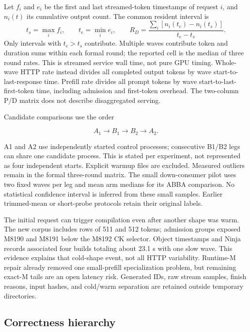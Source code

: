 \documentclass[sigplan,10pt]{acmart}
\begin{document}
Let $f_i$ and $e_i$ be the first and last streamed-token timestamps of request $i$, and $n_i(t)$ its cumulative output count. The common resident interval is
\begin{equation}
  t_s=\max_i f_i,\qquad t_e=\min_i e_i,\qquad
  R_D=\frac{\sum_i[n_i(t_e)-n_i(t_s)]}{t_e-t_s}.
\end{equation}
Only intervals with $t_e>t_s$ contribute. Multiple waves contribute token and duration sums within each formal round; the reported cell is the median of three round rates. This is streamed service wall time, not pure GPU timing. Whole-wave HTTP rate instead divides all completed output tokens by wave start-to-last-response time. Prefill rate divides all prompt tokens by wave start-to-last-first-token time, including admission and first-token overhead. The two-column P/D matrix does not describe disaggregated serving.

Candidate comparisons use the order

\begin{equation}
  A_1 \rightarrow B_1 \rightarrow B_2 \rightarrow A_2.
\end{equation}

A1 and A2 use independently started control processes; consecutive B1/B2 legs can share one candidate process. This is stated per experiment, not represented as four independent starts. Explicit warmup files are excluded. Measured outliers remain in the formal three-round matrix. The small down-consumer pilot uses two fixed waves per leg and mean arm medians for its ABBA comparison. No statistical confidence interval is inferred from these small samples. Earlier trimmed-mean or short-probe protocols retain their original labels.

The initial request can trigger compilation even after another shape was warm. The new corpus includes rows of 511 and 512 tokens; admission groups exposed M8190 and M8191 below the M8192 CK selector. Object timestamps and Ninja records associated four builds totaling about 23.1 s with one slow wave. This evidence explains that cold-shape event, not all HTTP variability. Runtime-M repair already removed one small-prefill specialization problem, but remaining exact-M tails are an open latency risk. Generated IDs, raw stream samples, finish reasons, input hashes, and cold/warm separation are retained outside temporary directories.

\subsection{Correctness hierarchy}
\end{document}
